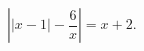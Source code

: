 \begin{ex}[type=equation]
	\begin{condition}
		$\left|\big | x -1\big|-\dfrac{6}{x}\right| = x+2.$
	\end{condition}
\end{ex}